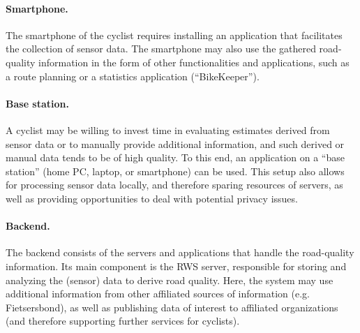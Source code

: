\documentclass[a4paper,11pt]{article}
\begin{document}
\paragraph{Smartphone.}
The smartphone of the cyclist requires installing an application that facilitates the collection of sensor data. 
The smartphone may also use the gathered road-quality information in the form of other functionalities and applications, 
such as a route planning or a statistics application (``BikeKeeper'').

\paragraph{Base station.}
A cyclist may be willing to invest time in evaluating estimates derived from sensor data or 
to manually provide additional information, and such derived or manual data tends to be of high quality. 
To this end, an application on a ``base station'' (home PC, laptop, or smartphone) can be used. 
This setup also allows for processing sensor data locally, and therefore sparing 
resources of servers, as well as providing opportunities to deal with potential privacy issues.

\paragraph{Backend.}
The backend consists of the servers and applications that handle the road-quality information. 
Its main component is the RWS server, responsible for storing and analyzing the (sensor) data to derive road quality. 
Here, the system may use additional information from other affiliated sources of information (e.g. Fietsersbond), 
as well as publishing data of interest to affiliated organizations (and therefore 
supporting further services for cyclists).
\end{document}
